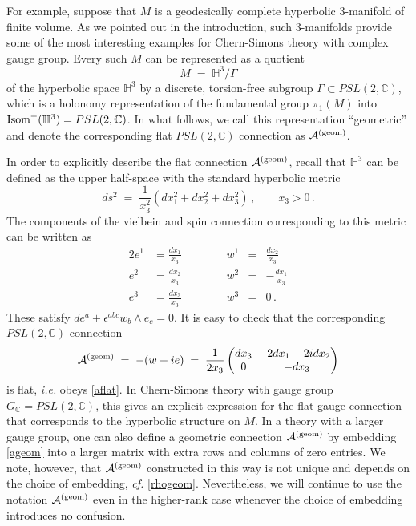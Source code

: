 \documentclass[hyper]{JHEP3}
\def\CA {{\cal A}}
\newcommand{\C}{{\mathbb{C}}}
\newcommand{\IH}{{\mathbb{H}}}
\newcommand\be{\begin{equation}}
\newcommand\ee{\end{equation}}
\def\={\;=\;}
\begin{document}
For example, suppose that $M$ is a geodesically complete hyperbolic 3-manifold
of finite volume. As we pointed out in the introduction,
such 3-manifolds provide some of the most interesting examples for Chern-Simons
theory with complex gauge group.
Every such $M$ can be represented as a quotient
\be
M \= \IH^3 / \Gamma
\label{mquotient}
\ee
of the hyperbolic space $\IH^3$
by a discrete, torsion-free subgroup $\Gamma \subset PSL(2,\C)$,
which is a holonomy representation of the fundamental group $\pi_1 (M)$
into ${\rm Isom}^+ ( \IH^3 ) = PSL (2,\C)$.
In what follows, we call this representation ``geometric''
and denote the corresponding flat $PSL(2,\C)$ connection as $\CA^{({\rm geom})}$.

In order to explicitly describe the flat connection $\CA^{({\rm geom})}$,
recall that $\IH^3$ can be defined as the upper half-space with the standard
hyperbolic metric
\be
ds^2 \= \frac{1}{x_3^2} (dx_1^2 + dx_2^2 + dx_3^2)\,, \qquad x_3>0\,.
\label{hthreemetric}
\ee
The components of the vielbein and spin connection
corresponding to this metric can be written as
\begin{alignat*}{2}
e^1 & = \frac{d x_1}{x_3} \quad \quad \quad \quad w^1 & = & \frac{d x_2}{x_3} \\
e^2 & = \frac{d x_2}{x_3} \quad \quad \quad \quad w^2 & = & -\frac{d x_1}{x_3} \\
e^3 & = \frac{d x_3}{x_3} \quad \quad \quad \quad w^3 & = & 0\,.
\end{alignat*}
These satisfy $de^a + \epsilon^{abc} w_b \wedge e_c = 0$.
It is easy to check that the corresponding $PSL(2,\C)$ connection
\be
\CA^{({\rm geom})} \=  -(w + ie) \= \frac{1}{2x_3}
\begin{pmatrix}
 d x_3 & ~2 dx_1 - 2 id x_2 \\
0 & -d x_3
\end{pmatrix}
\label{ageom}
\ee
is flat, {\it i.e.} obeys \eqref{aflat}.
In Chern-Simons theory with gauge group $G_{\C} = PSL(2,\C)$,
this gives an explicit expression for the flat gauge connection
that corresponds to the hyperbolic structure on $M$.
In a theory with a larger gauge group, one can also define
a geometric connection $\CA^{({\rm geom})}$ by embedding \eqref{ageom}
into a larger matrix with extra rows and columns of zero entries.
We note, however, that $\CA^{({\rm geom})}$ constructed in this way
is not unique and depends on the choice of embedding, {\it cf.} \eqref{rhogeom}.
Nevertheless, we will continue to use the notation $\CA^{({\rm geom})}$
even in the higher-rank case whenever the choice of embedding
introduces no confusion.
\end{document}
